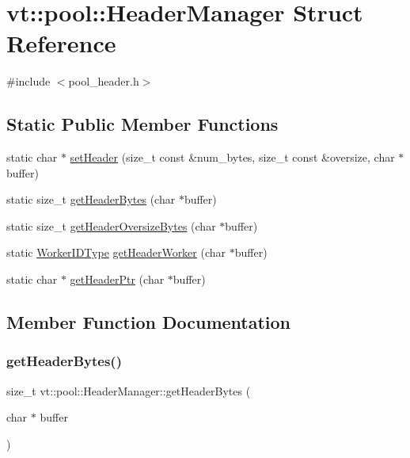\hypertarget{structvt_1_1pool_1_1_header_manager}{}\section{vt\+:\+:pool\+:\+:Header\+Manager Struct Reference}
\label{structvt_1_1pool_1_1_header_manager}


{\ttfamily \#include $<$pool\+\_\+header.\+h$>$}

\subsection*{Static Public Member Functions}
\begin{DoxyCompactItemize}
\item 
static char $\ast$ \hyperlink{structvt_1_1pool_1_1_header_manager_a1a11da8d1cf25c68ac3ff7ded5eb3a82}{set\+Header} (size\+\_\+t const \&num\+\_\+bytes, size\+\_\+t const \&oversize, char $\ast$buffer)
\item 
static size\+\_\+t \hyperlink{structvt_1_1pool_1_1_header_manager_ab244141fad3a844ac1b66fe83d12f105}{get\+Header\+Bytes} (char $\ast$buffer)
\item 
static size\+\_\+t \hyperlink{structvt_1_1pool_1_1_header_manager_a4b6ab8aab1f6f1a5b6f7da2b39914567}{get\+Header\+Oversize\+Bytes} (char $\ast$buffer)
\item 
static \hyperlink{namespacevt_a656e362091da17b9b93d0655b36e3392}{Worker\+I\+D\+Type} \hyperlink{structvt_1_1pool_1_1_header_manager_a381cb78e7f7eab63eae4dd4f7a60d868}{get\+Header\+Worker} (char $\ast$buffer)
\item 
static char $\ast$ \hyperlink{structvt_1_1pool_1_1_header_manager_a56ed12c2d6a6de2c2c543ecb95fb4838}{get\+Header\+Ptr} (char $\ast$buffer)
\end{DoxyCompactItemize}


\subsection{Member Function Documentation}
\mbox{\label{structvt_1_1pool_1_1_header_manager_ab244141fad3a844ac1b66fe83d12f105}} 
\subsubsection{\texorpdfstring{get\+Header\+Bytes()}{getHeaderBytes()}}
{\footnotesize\ttfamily size\+\_\+t vt\+::pool\+::\+Header\+Manager\+::get\+Header\+Bytes (\begin{DoxyParamCaption}\item[{char $\ast$}]{buffer }\end{DoxyParamCaption})\hspace{0.3cm}{\ttfamily [static]}}

